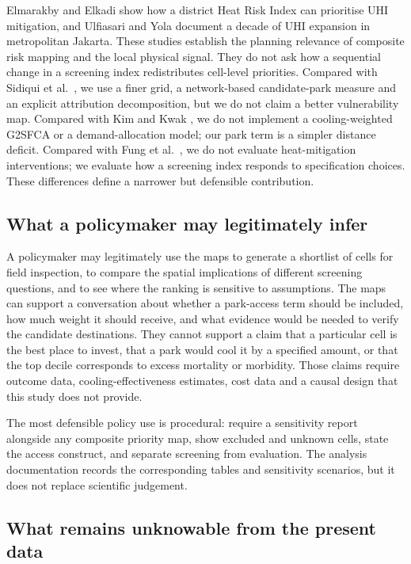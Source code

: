 \documentclass[times,twoside]{_Templates/MultiTargetManuscript}
\begin{document}
Elmarakby and Elkadi \citep{elmarakby2024} show how a district Heat Risk Index
can prioritise UHI mitigation, and Ulfiasari and Yola \citep{ulfiasari2022}
document a decade of UHI expansion in metropolitan Jakarta. These studies
establish the planning relevance of composite risk mapping and the local
physical signal. They do not ask how a sequential change in a screening index
redistributes cell-level priorities. Compared with Sidiqui et al.\
\citep{sidiqui2022}, we use a finer grid, a network-based candidate-park
measure and an explicit attribution decomposition, but we do not claim a better
vulnerability map. Compared with Kim and Kwak \citep{kim2026}, we do not
implement a cooling-weighted G2SFCA or a demand-allocation model; our park term
is a simpler distance deficit. Compared with Fung et al.\ \citep{fung2024}, we
do not evaluate heat-mitigation interventions; we evaluate how a screening index
responds to specification choices. These differences define a narrower but
defensible contribution.

\subsection{What a policymaker may legitimately infer}

A policymaker may legitimately use the maps to generate a shortlist of cells for
field inspection, to compare the spatial implications of different screening
questions, and to see where the ranking is sensitive to assumptions. The maps
can support a conversation about whether a park-access term should be included,
how much weight it should receive, and what evidence would be needed to verify
the candidate destinations. They cannot support a claim that a particular cell
is the best place to invest, that a park would cool it by a specified amount, or
that the top decile corresponds to excess mortality or morbidity. Those claims
require outcome data, cooling-effectiveness estimates, cost data and a causal
design that this study does not provide.

The most defensible policy use is procedural: require a sensitivity report
alongside any composite priority map, show excluded and unknown cells, state the
access construct, and separate screening from evaluation. The analysis
documentation records the corresponding tables and sensitivity scenarios, but
it does not replace scientific judgement.

\subsection{What remains unknowable from the present data}
\end{document}
